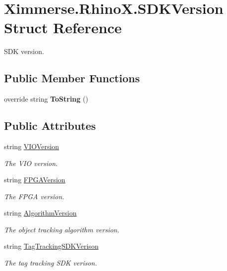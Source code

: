 \hypertarget{struct_ximmerse_1_1_rhino_x_1_1_s_d_k_version}{}\section{Ximmerse.\+Rhino\+X.\+S\+D\+K\+Version Struct Reference}
\label{struct_ximmerse_1_1_rhino_x_1_1_s_d_k_version}


S\+DK version.  


\subsection*{Public Member Functions}
\begin{DoxyCompactItemize}
\item 
\mbox{\label{struct_ximmerse_1_1_rhino_x_1_1_s_d_k_version_aa1d27d78864186442214c5259ddeda77}} 
override string {\bfseries To\+String} ()
\end{DoxyCompactItemize}
\subsection*{Public Attributes}
\begin{DoxyCompactItemize}
\item 
string \mbox{\hyperlink{struct_ximmerse_1_1_rhino_x_1_1_s_d_k_version_ae439edef76e7f763815d61ba8a167636}{V\+I\+O\+Version}}
\begin{DoxyCompactList}\small\item\em The V\+IO version. \end{DoxyCompactList}\item 
string \mbox{\hyperlink{struct_ximmerse_1_1_rhino_x_1_1_s_d_k_version_af49af2940a343f7874e6853b2eaa1f1a}{F\+P\+G\+A\+Version}}
\begin{DoxyCompactList}\small\item\em The F\+P\+GA version. \end{DoxyCompactList}\item 
string \mbox{\hyperlink{struct_ximmerse_1_1_rhino_x_1_1_s_d_k_version_af39e2ee57223d3dc46a4dcc873461dc8}{Algorithm\+Version}}
\begin{DoxyCompactList}\small\item\em The object tracking algorithm version. \end{DoxyCompactList}\item 
string \mbox{\hyperlink{struct_ximmerse_1_1_rhino_x_1_1_s_d_k_version_ab2f0c40eab8f2844d13f384f7bdc1004}{Tag\+Tracking\+S\+D\+K\+Verison}}
\begin{DoxyCompactList}\small\item\em The tag tracking S\+DK verison. \end{DoxyCompactList}\end{DoxyCompactItemize}


